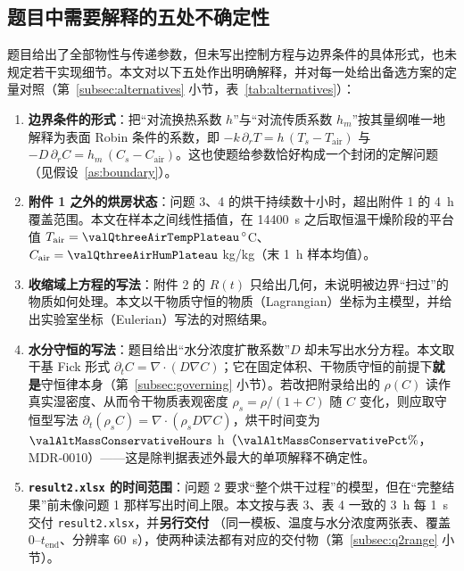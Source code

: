 \subsection{题目中需要解释的五处不确定性}
\label{subsec:ambiguity}
题目给出了全部物性与传递参数，但未写出控制方程与边界条件的具体形式，也未规定若干实现细节。本文对以下五处作出明确解释，并对每一处给出备选方案的定量对照（第~\ref{subsec:alternatives} 小节，表~\ref{tab:alternatives}）：

\begin{enumerate}[label=(\alph*),leftmargin=*]
  \item \textbf{边界条件的形式}：把“对流换热系数 $h$”与“对流传质系数 $h_m$”按其量纲唯一地解释为表面 Robin 条件的系数，即 $-k\,\partial_r T=h\,(T_s-T_{\mathrm{air}})$ 与 $-D\,\partial_r C=h_m\,(C_s-C_{\mathrm{air}})$。这也使题给参数恰好构成一个封闭的定解问题（见假设~\ref{as:boundary}）。
  \item \textbf{附件 1 之外的烘房状态}：问题 3、4 的烘干持续数十小时，超出附件 1 的 \SI{4}{\hour} 覆盖范围。本文在样本之间线性插值，在 \SI{14400}{\second} 之后取恒温干燥阶段的平台值 $T_{\mathrm{air}}=\valQthreeAirTempPlateau\,^\circ$C、$C_{\mathrm{air}}=\valQthreeAirHumPlateau$ kg/kg（末 \SI{1}{\hour} 样本均值）。
  \item \textbf{收缩域上方程的写法}：附件 2 的 $R(t)$ 只给出几何，未说明被边界“扫过”的物质如何处理。本文以干物质守恒的物质（Lagrangian）坐标为主模型，并给出实验室坐标（Eulerian）写法的对照结果。
  \item \textbf{水分守恒的写法}：题目给出“水分浓度扩散系数”$D$ 却未写出水分方程。本文取干基 Fick 形式 $\partial_tC=\nabla\!\cdot\!(D\nabla C)$；它在固定体积、干物质守恒的前提下\textbf{就是}守恒律本身（第~\ref{subsec:governing} 小节）。若改把附录给出的 $\rho(C)$ 读作真实湿密度、从而令干物质表观密度 $\rho_s=\rho/(1+C)$ 随 $C$ 变化，则应取守恒型写法 $\partial_t(\rho_sC)=\nabla\!\cdot\!(\rho_sD\nabla C)$，烘干时间变为 $\valAltMassConservativeHours$ h（$\valAltMassConservativePct\%$，MDR-0010）——这是除判据表述外最大的单项解释不确定性。
  \item \textbf{\nolinkurl{result2.xlsx} 的时间范围}：问题 2 要求“整个烘干过程”的模型，但在“完整结果”前未像问题 1 那样写出时间上限。本文按与表 3、表 4 一致的 \SI{3}{\hour} 每 \SI{1}{\second} 交付 \nolinkurl{result2.xlsx}，并\textbf{另行交付} （同一模板、温度与水分浓度两张表、覆盖 $0$--$t_{\mathrm{end}}$、分辨率 \SI{60}{\second}），使两种读法都有对应的交付物（第~\ref{subsec:q2range} 小节）。
\end{enumerate}
